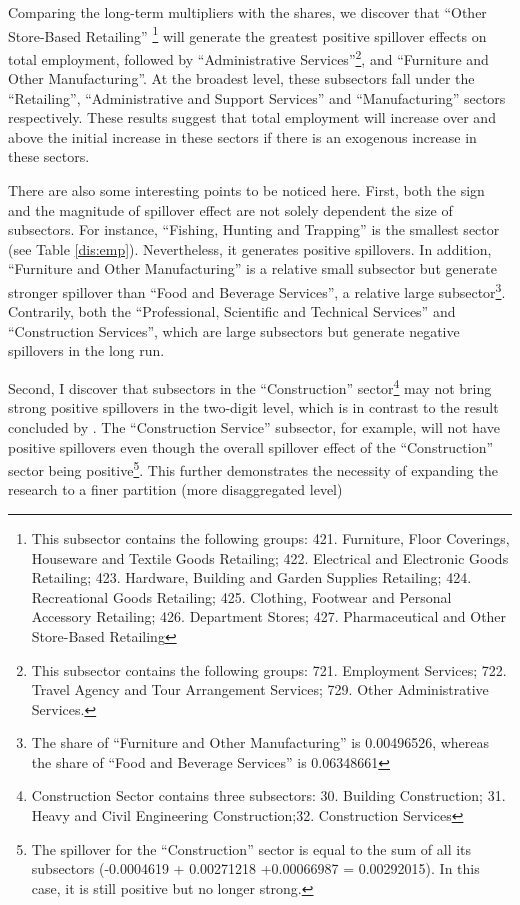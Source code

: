 \documentclass{monashthesis}
\begin{document}
Comparing the long-term multipliers with the shares, we discover that ``Other Store-Based Retailing'' \footnote{This subsector contains the following groups: 421. Furniture, Floor Coverings, Houseware and Textile Goods Retailing; 422. Electrical and Electronic Goods Retailing; 423. Hardware, Building and Garden Supplies Retailing; 424. Recreational Goods Retailing; 425. Clothing, Footwear and Personal Accessory Retailing; 426. Department Stores; 427. Pharmaceutical and Other Store-Based Retailing} will generate the greatest positive spillover effects on total employment, followed by ``Administrative Services''\footnote{This subsector contains the following groups: 721. Employment Services; 722. Travel Agency and Tour Arrangement Services; 729. Other Administrative Services.}, and ``Furniture and Other Manufacturing''. At the broadest level, these subsectors fall under the ``Retailing'', ``Administrative and Support Services'' and ``Manufacturing'' sectors respectively. These results suggest that total employment will increase over and above the initial increase in these sectors if there is an exogenous increase in these sectors.

There are also some interesting points to be noticed here. First, both the sign and the magnitude of spillover effect are not solely dependent the size of subsectors. For instance, ``Fishing, Hunting and Trapping'' is the smallest sector (see Table \ref{dis:emp}). Nevertheless, it generates positive spillovers. In addition, ``Furniture and Other Manufacturing'' is a relative small subsector but generate stronger spillover than ``Food and Beverage Services'', a relative large subsector\footnote{The share of ``Furniture and Other Manufacturing'' is 0.00496526, whereas the share of ``Food and Beverage Services'' is 0.06348661}. Contrarily, both the ``Professional, Scientific and Technical Services'' and ``Construction Services'', which are large subsectors but generate negative spillovers in the long run.

Second, I discover that subsectors in the ``Construction'' sector\footnote{Construction Sector contains three subsectors: 30. Building Construction; 31. Heavy and Civil Engineering Construction;32. Construction Services} may not bring strong positive spillovers in the two-digit level, which is in contrast to the result concluded by \textcite{anderson2020}. The ``Construction Service'' subsector, for example, will not have positive spillovers even though the overall spillover effect of the ``Construction'' sector being positive\footnote{The spillover for the ``Construction'' sector is equal to the sum of all its subsectors (-0.0004619 + 0.00271218 +0.00066987 = 0.00292015). In this case, it is still positive but no longer strong.}. This further demonstrates the necessity of expanding the research to a finer partition (more disaggregated level)
\end{document}
